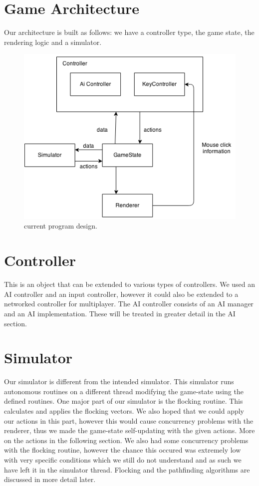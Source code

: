 \section{Game Architecture}
Our architecture is built as follows: we have a controller type, the game state, the rendering logic and a simulator. 

\begin{figure}[htbp]
	\centering
	\includegraphics[width=\textwidth]{CZHV_Diagram.png}
	\caption{current program design.}
\end{figure}

\FloatBarrier

\section{Controller}
This is an object that can be extended to various types of controllers. We used an AI controller and an input controller, however it could also be extended to a networked controller for multiplayer. The AI controller consists of an AI manager and an AI implementation. These will be treated in greater detail in the AI section.
\section{Simulator}
Our simulator is different from the intended simulator. This simulator runs autonomous routines on a different thread modifying the game-state using the defined routines. One major part of our simulator is the flocking routine. This calculates and applies the flocking vectors. We also hoped that we could apply our actions in this part, however this would cause concurrency problems with the renderer, thus we made the game-state self-updating with the given actions. More on the actions in the following section. We also had some concurrency problems with the flocking routine, however the chance this occured was extremely low with very specific conditions which we still do not understand and as such we have left it in the simulator thread. Flocking and the pathfinding algorithms are discussed in more detail later.
